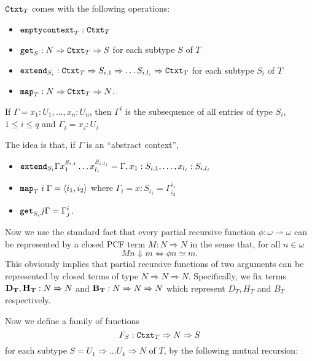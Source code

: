 \documentclass[11pt]{article}
\newcommand{\lang}{\langle}
\newcommand{\rang}{\rangle}
\begin{document}
${\tt Ctxt}_T$ comes with the following operations:
\begin{itemize}
\item ${\tt  emptycontext}_T:{\tt Ctxt}_T$
\item ${\tt get}_S: N\Rightarrow{\tt Ctxt}_T\Rightarrow S$ for each subtype
$S$ of $T$
\item ${\tt extend}_{S_i}:{\tt Ctxt}_T\Rightarrow S_{i,1}\Rightarrow\dots
S_{i,l_i}\Rightarrow{\tt Ctxt}_T$ for each subtype $S_i$ of $T$
\item ${\tt map}_T: N\Rightarrow{\tt Ctxt}_T\Rightarrow N$.
\end{itemize}

If $\Gamma=x_1:U_1,\dots,x_n:U_n$, then $\Gamma^i$ is the subsequence of all
entries of type $S_i$, $1\leq i\leq q$ and $\Gamma_j=x_j:U_j$

The idea is that, if $\Gamma$ is an ``abstract context'',
\begin{itemize}
\item ${\tt extend}_{S_i} \Gamma x_1^{S_{i,1}}\dots x_{l_i}^{S_{i,l_i}}=
\Gamma,x_1:S_{i,1},\dots,x_{l_i}:S_{i,l_i}$
\item ${\tt map}_T \;i \;\Gamma =\lang i_1,i_2\rang $ where $\Gamma_i=x:S_{i_1}=
\Gamma_{i_2}^{i_1}$
\item ${\tt get}_{S_i} j \Gamma = \Gamma_j^i$.
\end{itemize}

Now we use the standard fact that every partial recursive function
$\phi:\omega\rightharpoonup\omega$ can be represented by a closed PCF term
$M: N\Rightarrow N$ in the sense that, for all $n\in\omega$
$$M n\Downarrow m\Leftrightarrow \phi n\simeq m .$$
This obviously implies that partial recursive functions of two arguments can
be represented by closed terms of type $ N\Rightarrow N\Rightarrow N$.
Specifically, we fix terms ${\bf  D_T,H_T}:N \Rightarrow N$ and
${\bf B_T}: N\Rightarrow N\Rightarrow N$ which represent $D_T,H_T$ and $B_T$
respectively.

Now we define a family of functions $$F_S:{\tt Ctxt}_T\Rightarrow
N\Rightarrow S$$ for each subtype $S=U_1\Rightarrow\dots
U_k\Rightarrow N$ of $T$, by the following mutual recursion:
\end{document}
